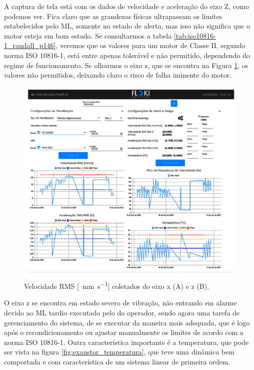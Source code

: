 A captura de tela está com os dados de velocidade e aceleração do eixo Z, como podemos ver. Fica claro que as grandezas físicas
ultrapassam os limites estabelecidos pelo ML, somente no estado de alerta, mas isso não significa que o motor esteja em bom estado.
Se consultarmos a tabela \ref{tab:iso10816-1_randall_p146}, veremos que os valores para um motor de Classe II, segundo norma  ISO 10816-1, está 
entre apenas tolerável e não permitido, dependendo do regime de funcionamento. 
Se olharmos o eixo z, que se encontra na Figura \ref{fig:exaustor_xz}, os valores não permitidos, deixando claro o risco de falha iminente do 
motor.

\begin{figure}[H]
    \caption{Velocidade RMS [\SI{}{\milli\metre\per\second}] coletados do eixo x (A) e z (B).}
    \begin{center}
        \includegraphics[scale=0.65, page=2]{resultados/img/resultados.pdf}
    \end{center}
    \label{fig:exaustor_xz}
\end{figure}

O eixo z se encontra em estado severo de vibração, não entrando em alarme devido ao ML tardio executado
pelo do operador, sendo agora uma tarefa de gerenciamento do sistema, de se executar da maneira mais adequada, que é logo após o recondicionamento 
ou ajustar manualmente os limites de acordo com a norma ISO 10816-1. Outra característica importante é a temperatura, que pode ser vista na 
figura \ref{fig:exaustor_temperatura}, que teve uma dinâmica bem comportada e com característica de um sistema linear de primeira ordem.


